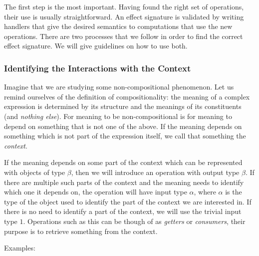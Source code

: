 The first step is the most important. Having found the right set of
operations, their use is usually straightforward. An effect signature is
validated by writing handlers that give the desired semantics to
computations that use the new operations. There are two processes that we
follow in order to find the correct effect signature. We will give
guidelines on how to use both.


\subsubsection{Identifying the Interactions with the Context}

Imagine that we are studying some non-compositional phenomenon. Let us
remind ourselves of the definition of compositionality: the meaning of a
complex expression is determined by its structure and the meanings of its
constituents~\cite{sep-compositionality} (and \emph{nothing else}). For
meaning to be non-compositional is for meaning to depend on something that
is not one of the above. If the meaning depends on something which is not
part of the expression itself, we call that something the \emph{context}.

If the meaning depends on some part of the context which can be represented
with objects of type $\beta$, then we will introduce an operation with
output type $\beta$. If there are multiple such parts of the context and
the meaning needs to identify which one it depends on, the operation will
have input type $\alpha$, where $\alpha$ is the type of the object used to
identify the part of the context we are interested in. If there is no need
to identify a part of the context, we will use the trivial input type
$1$. Operations such as this can be though of as \emph{getters} or
\emph{consumers}, their purpose is to retrieve something from the context.

Examples:


